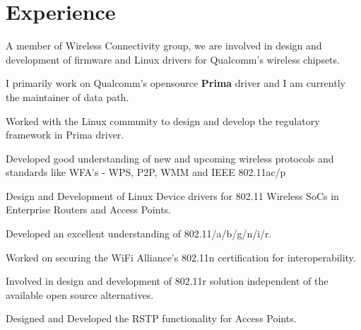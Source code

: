 \documentclass[letterpaper]{deedy-resume} %
\begin{document}
\hfill
%
%
\begin{minipage}[t]{0.66\textwidth} %


\section{Experience}


\vspace{\topsep} %
\begin{tightitemize}
\item A member of Wireless Connectivity group, we are involved in design and development of firmware and Linux drivers for Qualcomm's wireless chipsets.
\item I primarily work on  Qualcomm's opensource \textbf{Prima} driver and I am currently the maintainer of data path.
\item Worked with the Linux community to design and develop the regulatory framework in Prima driver.
\item Developed good understanding of new and upcoming wireless protocols and standards like WFA's - WPS, P2P, WMM and IEEE 802.11ac/p
\end{tightitemize}

\sectionspace %



\begin{tightitemize}
\item Design and Development of Linux Device drivers for 802.11 Wireless SoCs in Enterprise Routers and Access Points.
\item Developed an excellent understanding of 802.11/a/b/g/n/i/r.
\item Worked on securing the WiFi Alliance's 802.11n certification for interoperability.
\item Involved in design and development of 802.11r solution independent of the available open source alternatives.
\item Designed and Developed the RSTP functionality for Access Points.
\end{tightitemize}


\end{minipage}
\end{document}
